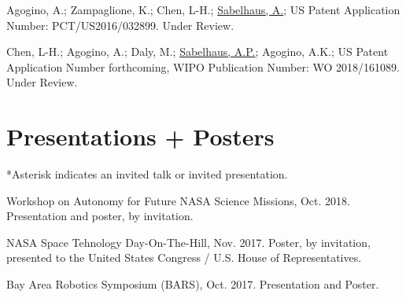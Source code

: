 \documentclass[letterpaper]{deedy-resume} %
\begin{document}
{\begin{etaremune}
\item {} Agogino, A.; Zampaglione, K.; Chen, L-H.; \underline{Sabelhaus, A.}; US Patent Application Number: PCT/US2016/032899. Under Review.

\item {} Chen, L-H.; Agogino, A.; Daly, M.; \underline{Sabelhaus, A.P.}; Agogino, A.K.; US Patent Application Number forthcoming, WIPO Publication Number: WO 2018/161089. Under Review.

\end{etaremune}



\section{Presentations + Posters}

\vspace{0.1cm}


*Asterisk indicates an invited talk or invited presentation.


\begin{etaremune}
  

\item {\Large{\textasteriskcentered}} {} Workshop on Autonomy for Future NASA Science Missions, Oct. 2018. Presentation and poster, by invitation.
  
\item {\Large{\textasteriskcentered}} {} NASA Space Tehnology Day-On-The-Hill, Nov. 2017. Poster, by invitation, presented to the United States Congress / U.S. House of Representatives.

\item {} Bay Area Robotics Symposium (BARS), Oct. 2017. Presentation and Poster.


\end{etaremune}}
\end{document}
